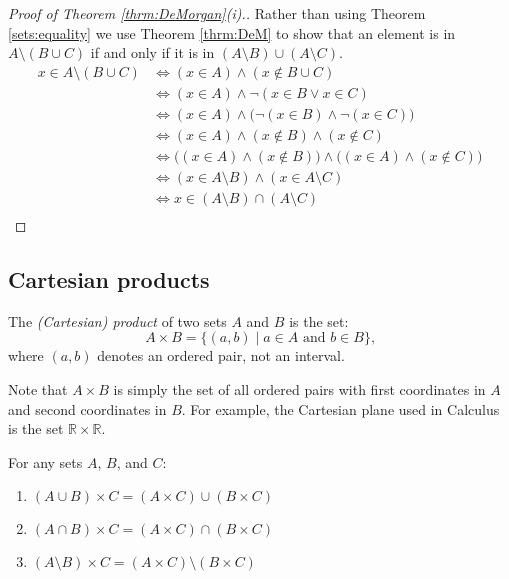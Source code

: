 \begin{proof}[Proof of Theorem \ref{thrm:DeMorgan}(i).]
Rather than using Theorem \ref{sets:equality} we use Theorem
\ref{thrm:DeM} to show that an element is in $A\setminus(B\cup C)$
if and only if it is in $(A\setminus B)\cup(A\setminus C)$.
\begin{equation*}
\begin{split}
x\in A\setminus(B\cup C) &\Leftrightarrow (x\in A)\land (x\notin B\cup
C) \\
&\Leftrightarrow (x\in A)\land \neg(x\in B \lor x\in C) \\
&\Leftrightarrow (x\in A)\land \bigl( \neg (x\in B)\land \neg (x\in
C)\bigr) \\
&\Leftrightarrow (x\in A)\land (x\notin B)\land (x\notin C) \\
&\Leftrightarrow \bigl( (x\in A)\land (x\notin B)\bigr) \land \bigl(
(x\in A)\land (x\notin C)\bigr) \\
&\Leftrightarrow (x\in A\setminus B)\land (x\in A\setminus C) \\
&\Leftrightarrow x\in (A\setminus B)\cap (A\setminus C) \\
\end{split}
\end{equation*}
\end{proof}

\subsection{Cartesian products}

\begin{definition}
The \emph{(Cartesian) product} of two sets $A$ and $B$ is the set: \[A\times B=\{ (a,b) \mid a\in A \text{ and } b\in B\}\text{,}\] where $(a,b)$ denotes an ordered pair, not an interval.
\end{definition}

Note that $A\times B$ is simply the set of all ordered pairs with first coordinates in $A$ and second coordinates in $B$.  For example, the Cartesian plane used in Calculus is the set ${\mathbb R}\times{\mathbb R}$.

\begin{thrm}\label{thrm:products}
For any sets $A$, $B$, and $C$:
\begin{enumerate}
\item $(A\cup B)\times C=(A\times C)\cup(B\times C)$
\item $(A\cap B)\times C=(A\times C)\cap(B\times C)$
\item $(A\setminus B)\times C=(A\times C)\setminus(B\times C)$
\end{enumerate}
\end{thrm}

